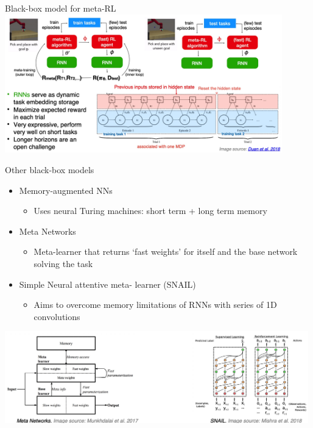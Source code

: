 \documentclass[aspectratio=169,t,handout,xcolor={usenames,dvipsnames}]{beamer}
\begin{document}
\begin{frame}{Black-box model for meta-RL}
    \centering\includegraphics[height=6cm]{image/Jietu20220329-013804.jpg}
\end{frame}
\begin{frame}{Other black-box models}
    \begin{itemize}
        \item Memory-augmented NNs 
        \begin{itemize}
            \item Uses neural Turing machines: short term + long term memory
        \end{itemize}
        \item Meta Networks 
        \begin{itemize}
            \item Meta-learner that returns ‘fast weights’ for itself and the base network solving the task
        \end{itemize}
        \item Simple Neural attentive meta- learner (SNAIL)
        \begin{itemize}
            \item Aims to overcome memory limitations of RNNs with series of 1D convolutions
        \end{itemize}
    \end{itemize}
    \centering\includegraphics[height=4cm]{image/Jietu20220329-014112.jpg}
\end{frame}
\end{document}
